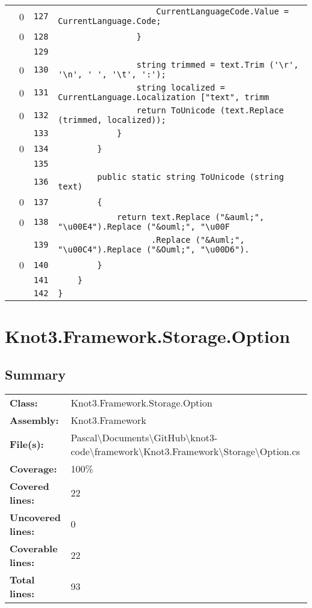 \documentclass[a4paper,10pt]{article}
\begin{document}
\begin{longtable}[l]{lrrl}
\cellcolor{red} & 0 & \verb~127~ & \verb~                    CurrentLanguageCode.Value = CurrentLanguage.Code;~\\
\cellcolor{red} & 0 & \verb~128~ & \verb~                }~\\
\cellcolor{gray} &  & \verb~129~ & \verb~~\\
\cellcolor{red} & 0 & \verb~130~ & \verb~                string trimmed = text.Trim ('\r', '\n', ' ', '\t', ':');~\\
\cellcolor{red} & 0 & \verb~131~ & \verb~                string localized = CurrentLanguage.Localization ["text", trimm~\\
\cellcolor{red} & 0 & \verb~132~ & \verb~                return ToUnicode (text.Replace (trimmed, localized));~\\
\cellcolor{gray} &  & \verb~133~ & \verb~            }~\\
\cellcolor{red} & 0 & \verb~134~ & \verb~        }~\\
\cellcolor{gray} &  & \verb~135~ & \verb~~\\
\cellcolor{gray} &  & \verb~136~ & \verb~        public static string ToUnicode (string text)~\\
\cellcolor{red} & 0 & \verb~137~ & \verb~        {~\\
\cellcolor{red} & 0 & \verb~138~ & \verb~            return text.Replace ("&auml;", "\u00E4").Replace ("&ouml;", "\u00F~\\
\cellcolor{gray} &  & \verb~139~ & \verb~                   .Replace ("&Auml;", "\u00C4").Replace ("&Ouml;", "\u00D6").~\\
\cellcolor{red} & 0 & \verb~140~ & \verb~        }~\\
\cellcolor{gray} &  & \verb~141~ & \verb~    }~\\
\cellcolor{gray} &  & \verb~142~ & \verb~}~\\
\end{longtable}
\newpage
\section{Knot3.Framework.Storage.Option}
\subsection{Summary}
\begin{longtable}[l]{ll}
\textbf{Class:} & Knot3.Framework.Storage.Option\\
\textbf{Assembly:} & Knot3.Framework\\
\textbf{File(s):} & \begin{minipage}[t]{12cm}{Pascal\textbackslash Documents\textbackslash GitHub\textbackslash knot3-code\textbackslash framework\textbackslash Knot3.Framework\textbackslash Storage\textbackslash Option.cs}\end{minipage} \\
\textbf{Coverage:} & 100\%\\
\textbf{Covered lines:} & 22\\
\textbf{Uncovered lines:} & 0\\
\textbf{Coverable lines:} & 22\\
\textbf{Total lines:} & 93\\
\end{longtable}
\end{document}
